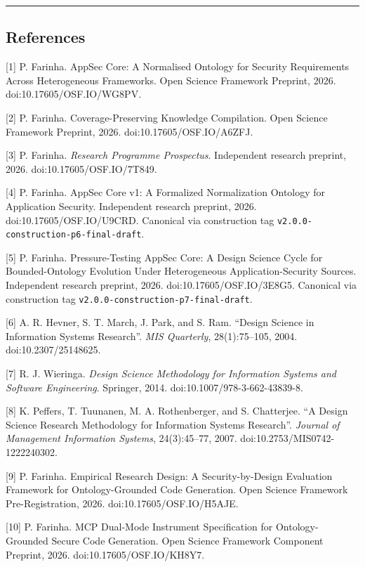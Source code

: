 \documentclass[
]{article}
\begin{document}
\begin{center}\rule{0.5\linewidth}{0.5pt}\end{center}

\subsection{References}\label{references}

{[}1{]} P. Farinha. AppSec Core: A Normalised Ontology for Security
Requirements Across Heterogeneous Frameworks. Open Science Framework
Preprint, 2026. doi:10.17605/OSF.IO/WG8PV.

{[}2{]} P. Farinha. Coverage-Preserving Knowledge Compilation. Open
Science Framework Preprint, 2026. doi:10.17605/OSF.IO/A6ZFJ.

{[}3{]} P. Farinha. \emph{Research Programme Prospectus}. Independent
research preprint, 2026. doi:10.17605/OSF.IO/7T849.

{[}4{]} P. Farinha. AppSec Core v1: A Formalized Normalization Ontology
for Application Security. Independent research preprint, 2026.
doi:10.17605/OSF.IO/U9CRD. Canonical via construction tag
\texttt{v2.0.0-construction-p6-final-draft}.

{[}5{]} P. Farinha. Pressure-Testing AppSec Core: A Design Science Cycle
for Bounded-Ontology Evolution Under Heterogeneous Application-Security
Sources. Independent research preprint, 2026. doi:10.17605/OSF.IO/3E8G5.
Canonical via construction tag
\texttt{v2.0.0-construction-p7-final-draft}.

{[}6{]} A. R. Hevner, S. T. March, J. Park, and S. Ram. ``Design Science
in Information Systems Research''. \emph{MIS Quarterly}, 28(1):75--105,
2004. doi:10.2307/25148625.

{[}7{]} R. J. Wieringa. \emph{Design Science Methodology for Information
Systems and Software Engineering}. Springer, 2014.
doi:10.1007/978-3-662-43839-8.

{[}8{]} K. Peffers, T. Tuunanen, M. A. Rothenberger, and S. Chatterjee.
``A Design Science Research Methodology for Information Systems
Research''. \emph{Journal of Management Information Systems},
24(3):45--77, 2007. doi:10.2753/MIS0742-1222240302.

{[}9{]} P. Farinha. Empirical Research Design: A Security-by-Design
Evaluation Framework for Ontology-Grounded Code Generation. Open Science
Framework Pre-Registration, 2026. doi:10.17605/OSF.IO/H5AJE.

{[}10{]} P. Farinha. MCP Dual-Mode Instrument Specification for
Ontology-Grounded Secure Code Generation. Open Science Framework
Component Preprint, 2026. doi:10.17605/OSF.IO/KH8Y7.
\end{document}
